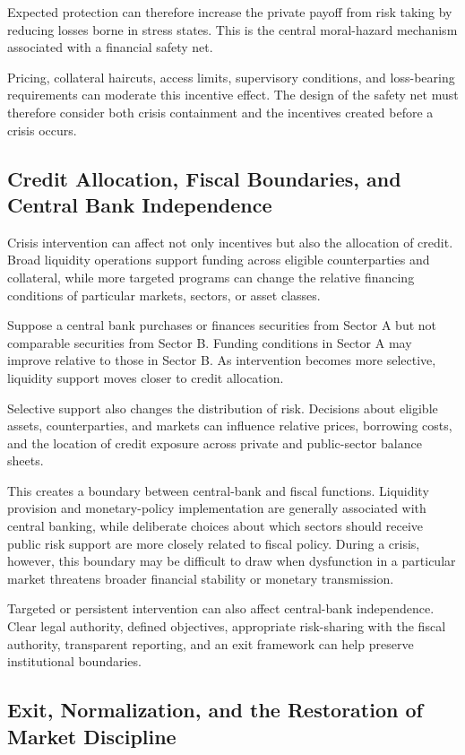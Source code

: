 Expected protection can therefore increase the private payoff from risk taking by reducing losses borne in stress states. This is the central moral-hazard mechanism associated with a financial safety net.

Pricing, collateral haircuts, access limits, supervisory conditions, and loss-bearing requirements can moderate this incentive effect. The design of the safety net must therefore consider both crisis containment and the incentives created before a crisis occurs.

\subsection{Credit Allocation, Fiscal Boundaries, and Central Bank Independence}

Crisis intervention can affect not only incentives but also the allocation of credit. Broad liquidity operations support funding across eligible counterparties and collateral, while more targeted programs can change the relative financing conditions of particular markets, sectors, or asset classes.

Suppose a central bank purchases or finances securities from Sector A but not comparable securities from Sector B. Funding conditions in Sector A may improve relative to those in Sector B. As intervention becomes more selective, liquidity support moves closer to credit allocation.

Selective support also changes the distribution of risk. Decisions about eligible assets, counterparties, and markets can influence relative prices, borrowing costs, and the location of credit exposure across private and public-sector balance sheets.

This creates a boundary between central-bank and fiscal functions. Liquidity provision and monetary-policy implementation are generally associated with central banking, while deliberate choices about which sectors should receive public risk support are more closely related to fiscal policy. During a crisis, however, this boundary may be difficult to draw when dysfunction in a particular market threatens broader financial stability or monetary transmission.

Targeted or persistent intervention can also affect central-bank independence. Clear legal authority, defined objectives, appropriate risk-sharing with the fiscal authority, transparent reporting, and an exit framework can help preserve institutional boundaries.


\subsection{Exit, Normalization, and the Restoration of Market Discipline}

